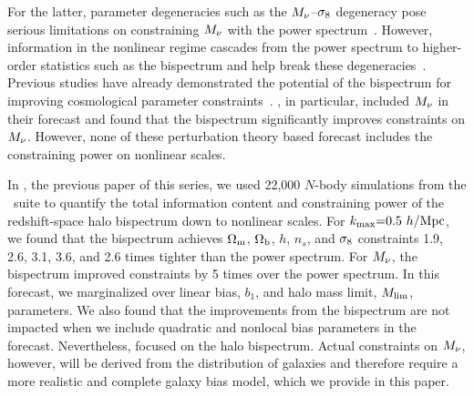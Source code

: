 For the latter, parameter degeneracies such as the $M_\nu$--$\sigma_8$
degeneracy pose serious limitations on constraining 
$M_\nu$ with the power spectrum~\citep{villaescusa-navarro2018a}. However, 
information in the nonlinear regime cascades
from the power spectrum to higher-order statistics such as the bispectrum 
and help break these degeneracies~\citep{hahn2020}. Previous studies have already demonstrated the
potential of the bispectrum for improving cosmological parameter
constraints~\citep{sefusatti2005, sefusatti2006, chan2017, yankelevich2019,
agarwal2020}.
\cite{chudaykin2019}, in particular, included $M_\nu$ in their forecast and
found that the bispectrum significantly improves constraints on $M_\nu$.
However, none of these perturbation theory based forecast includes the
constraining power on nonlinear scales. 

In \cite{hahn2020}, the previous paper of this series, we used 22,000 $N$-body
simulations from the \quij~suite to quantify the total information content and
constraining power of the redshift-space halo bispectrum down to nonlinear scales. 
For $k_{\rm max}{=}0.5~h/{\rm Mpc}$, we found that the bispectrum achieves $\Omega_{\rm m}$,
$\Omega_{\rm b}$, $h$, $n_s$, and $\sigma_8$ constraints 1.9, 2.6, 3.1, 3.6, and 2.6 times
tighter than the power spectrum. For $M_\nu$, the bispectrum improved 
constraints by 5 times over the power spectrum. In this forecast, we marginalized 
over linear bias, $b_1$, and halo mass limit, $M_{\rm lim}$, parameters. We also found that the
improvements from the bispectrum are not impacted when we include quadratic 
and nonlocal bias parameters in the forecast. Nevertheless, \cite{hahn2020}
focused on the halo bispectrum. Actual constraints on $M_\nu$, however, will be 
derived from the distribution of galaxies and therefore require a more 
realistic and complete galaxy bias model, which we provide in this paper.

